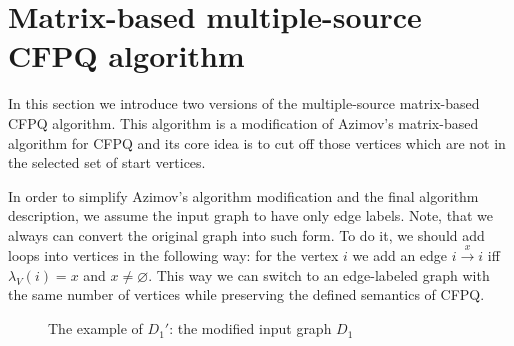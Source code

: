 \section{Matrix-based multiple-source CFPQ algorithm}
\label{sec:multiple-source-algo}

 In this section we introduce two versions of the multiple-source matrix-based CFPQ algorithm.
 This algorithm is a modification of Azimov's matrix-based algorithm for CFPQ and its core idea is to cut off those vertices which are not in the selected set of start vertices.


In order to simplify Azimov's algorithm modification and the final algorithm description, we assume the input graph to have only edge labels.
Note, that we always can convert the original graph into such form.
To do it, we should add loops into vertices in the following way: for the vertex $i$ we add an edge $i \xrightarrow{x} i$ iff $\lambda_V(i) = x$ and $x\neq \varnothing$.
This way we can switch to an edge-labeled graph with the same number of vertices while preserving the defined semantics of CFPQ.

\begin{figure}[h]
    \centering
    \caption{The example of $D_1'$: the modified input graph $D_1$}
    \label{fig:example_modified_input_graph}
\end{figure}

